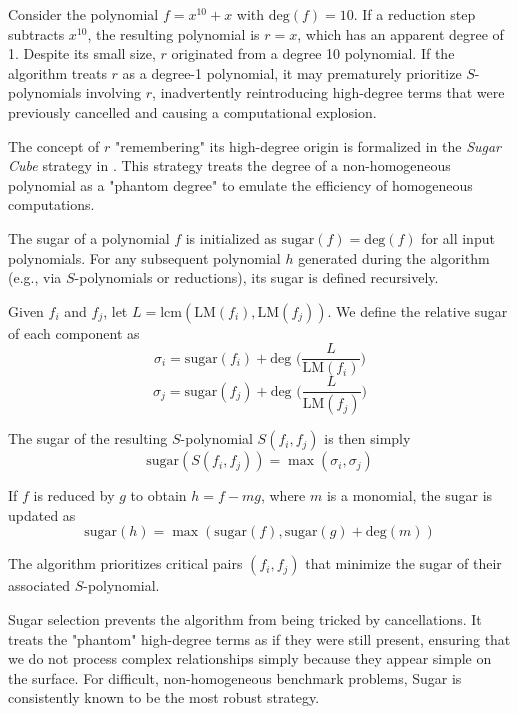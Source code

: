 \begin{example}
Consider the polynomial $f = x^{10} + x$ with $\text{deg}(f) = 10$. If a reduction step subtracts $x^{10}$, the resulting polynomial is $r = x$, which has an apparent degree of 1. Despite its small size, $r$ originated from a degree 10 polynomial. If the algorithm treats $r$ as a degree-1 polynomial, it may prematurely prioritize $S$-polynomials involving $r$, inadvertently reintroducing high-degree terms that were previously cancelled and causing a computational explosion.
\end{example}

The concept of $r$ "remembering" its high-degree origin is formalized in the \textit{Sugar Cube} strategy in \cite{Giovini1991_OneSugarCube}. This strategy treats the degree of a non-homogeneous polynomial as a "phantom degree" to emulate the efficiency of homogeneous computations.

\begin{definition}
    \label{def:sugar_select}
    The sugar of a polynomial $f$ is initialized as $\text{sugar}(f) = \text{deg}(f)$ for all input polynomials. For any subsequent polynomial $h$ generated during the algorithm (e.g., via $S$-polynomials or reductions), its sugar is defined recursively.
    
    Given $f_{i}$ and $f_{j}$, let $L=\text{lcm}(\text{LM}(f_{i}),\text{LM}(f_{j}))$. We define the relative sugar of each component as
    $$
    \sigma_{i} = \text{sugar}(f_{i})+\text{deg }\bigg(\frac{L}{\text{LM}(f_{i})}\bigg)
    $$
    $$
    \sigma_{j} = \text{sugar}(f_{j})+\text{deg }\bigg(\frac{L}{\text{LM}(f_{j})}\bigg)
    $$
    
    The sugar of the resulting $S$-polynomial $S(f_{i},f_{j})$ is then simply
    $$
    \text{sugar}(S(f_{i},f_{j}))= \max(\sigma_{i},\sigma_{j})
    $$

    If $f$ is reduced by $g$ to obtain $h=f-mg$, where $m$ is a monomial, the sugar is updated as
    $$
    \text{sugar}(h)=\max (\text{sugar}(f),\text{sugar}(g)+\text{deg}(m))
    $$

    The algorithm prioritizes critical pairs $(f_{i},f_{j})$ that minimize the sugar of their associated $S$-polynomial.
\end{definition}

Sugar selection prevents the algorithm from being tricked by cancellations. It treats the "phantom" high-degree terms as if they were still present, ensuring that we do not process complex relationships simply because they appear simple on the surface. For difficult, non-homogeneous benchmark problems, Sugar is consistently known to be the most robust strategy.

